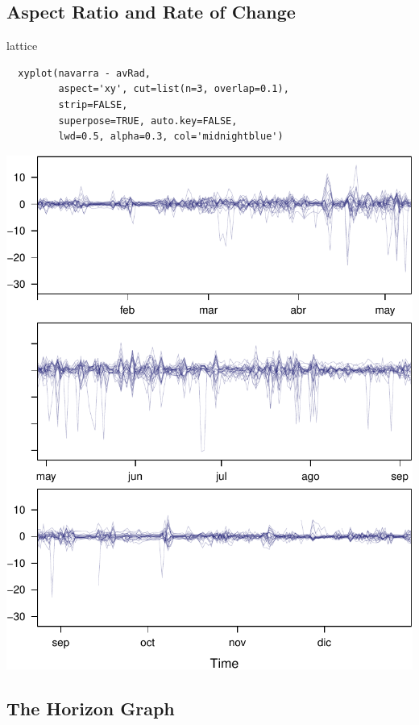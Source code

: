 \documentclass[xcolor={usenames,svgnames,dvipsnames}]{beamer}
\begin{document}
\subsection{Aspect Ratio and Rate of Change}
\label{sec-3-2}

\begin{frame}[fragile,label=sec-3-2-1]{lattice}
 \lstset{language=R,label= ,caption= ,numbers=none}
\begin{lstlisting}
  xyplot(navarra - avRad,
         aspect='xy', cut=list(n=3, overlap=0.1),
         strip=FALSE,
         superpose=TRUE, auto.key=FALSE,
         lwd=0.5, alpha=0.3, col='midnightblue')
\end{lstlisting}
\end{frame}

\begin{frame}[label=sec-3-2-2]{}
\includegraphics[width=.9\linewidth]{figs/navarraBanking.pdf}
\end{frame}


\subsection{The Horizon Graph}
\label{sec-3-3}
\end{document}
